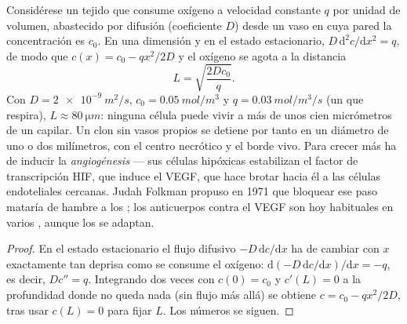 \begin{proposition}\label{prop:b3:cancer-biology:oxygen}
Considérese un tejido que consume oxígeno a velocidad constante $q$ por
unidad de volumen, abastecido por difusión (coeficiente $D$) desde un
vaso en cuya pared la concentración es $c_{0}$. En una dimensión y en el
estado estacionario, $D\,
\mathrm{d}^{2}c/\mathrm{d}x^{2} = q$, de modo que
$c(x) = c_{0} - qx^{2}/2D$ y el oxígeno se agota a la distancia
\[
L = \sqrt{\frac{2Dc_{0}}{q}} .
\]
Con $D = \qty{2e-9}{m^2/s}$, $c_{0} = \qty{0.05}{mol/m^3}$ y $q =
\qty{0.03}{mol/m^3/s}$ (un  que respira), $L \approx \qty{80}{\micro
m}$: ninguna célula puede vivir a más de unos cien micrómetros de un
capilar. Un clon sin vasos propios se detiene por tanto en un diámetro de
uno o dos milímetros, con el centro necrótico y el borde vivo. Para
crecer más ha de inducir la \emph{angiogénesis} --- sus células
hipóxicas estabilizan el factor de transcripción HIF, que induce el VEGF,
que hace brotar hacia él a las células endoteliales cercanas. Judah
Folkman propuso en 1971 que bloquear ese paso mataría de hambre a los
; los anticuerpos contra el VEGF son hoy habituales en varios
, aunque los  se adaptan.
\end{proposition}
\begin{proof}
En el estado estacionario el flujo difusivo $-D\,\mathrm{d}c/\mathrm{d}x$
ha de cambiar con $x$ exactamente tan deprisa como se consume el oxígeno:
$\mathrm{d}(-D\,
\mathrm{d}c/\mathrm{d}x)/\mathrm{d}x = -q$, es decir, $D c'' = q$.
Integrando dos veces con $c(0) = c_{0}$ y $c'(L) = 0$ a la profundidad
donde no queda nada (sin flujo más allá) se obtiene
$c = c_{0} - qx^{2}/2D$, tras usar $c(L) = 0$ para fijar $L$. Los números
se siguen.
\end{proof}

